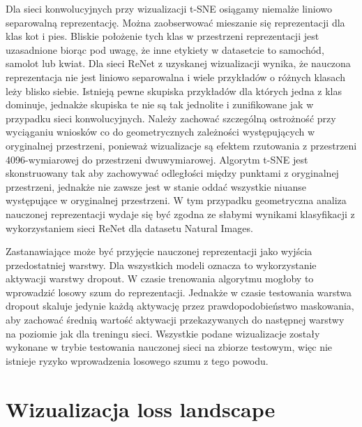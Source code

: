 \documentclass[oneside, mag]{mgr}
\begin{document}
Dla sieci konwolucyjnych przy wizualizacji t-SNE osiągamy niemalże liniowo separowalną reprezentację. Można zaobserwować mieszanie się reprezentacji dla klas kot i pies. Bliskie położenie tych klas w przestrzeni reprezentacji jest uzasadnione biorąc pod uwagę, że inne etykiety w datasetcie to samochód, samolot lub kwiat. Dla sieci ReNet z uzyskanej wizualizacji wynika, że nauczona reprezentacja nie jest liniowo separowalna i wiele przykładów o różnych klasach leży blisko siebie. Istnieją pewne skupiska przykładów dla których jedna z klas dominuje, jednakże skupiska te nie są tak jednolite i zunifikowane jak w przypadku sieci konwolucyjnych.
Należy zachować szczególną ostrożność przy wyciąganiu wniosków co do geometrycznych zależności występujących w oryginalnej przestrzeni, ponieważ wizualizacje są efektem rzutowania z przestrzeni 4096-wymiarowej do przestrzeni dwuwymiarowej. Algorytm t-SNE jest skonstruowany tak aby zachowywać odległości między punktami z oryginalnej przestrzeni, jednakże nie zawsze jest w stanie oddać wszystkie niuanse występujące w oryginalnej przestrzeni. W tym przypadku geometryczna analiza nauczonej reprezentacji wydaje się być zgodna ze słabymi wynikami klasyfikacji z wykorzystaniem sieci ReNet dla datasetu Natural Images.

Zastanawiające może być przyjęcie nauczonej reprezentacji jako wyjścia przedostatniej warstwy. Dla wszystkich modeli oznacza to wykorzystanie aktywacji warstwy dropout. W czasie trenowania algorytmu mogłoby to wprowadzić losowy szum do reprezentacji. Jednakże w czasie testowania warstwa dropout skaluje jedynie każdą aktywację przez prawdopodobieństwo maskowania, aby zachować średnią wartość aktywacji przekazywanych do następnej warstwy na poziomie jak dla treningu sieci. Wszystkie podane wizualizacje zostały wykonane w trybie testowania nauczonej sieci na zbiorze testowym, więc nie istnieje ryzyko wprowadzenia losowego szumu z tego powodu.

\section{Wizualizacja loss landscape}
\end{document}

